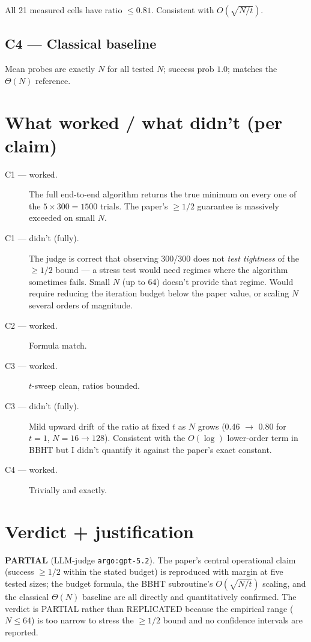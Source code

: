\documentclass[11pt]{article}
\begin{document}
All 21 measured cells have ratio $\leq 0.81$. Consistent with $O(\sqrt{N/t})$.

\subsection{C4 --- Classical baseline}

Mean probes are exactly $N$ for all tested $N$; success prob $1.0$; matches the
$\Theta(N)$ reference.

\section{What worked / what didn't (per claim)}

\begin{description}
\item[C1 --- worked.] The full end-to-end algorithm returns the true minimum on
every one of the $5\times 300 = 1500$ trials. The paper's $\geq 1/2$ guarantee is
massively exceeded on small $N$.
\item[C1 --- didn't (fully).] The judge is correct that observing 300/300 does
not \emph{test tightness} of the $\geq 1/2$ bound --- a stress test would need
regimes where the algorithm sometimes fails. Small $N$ (up to 64) doesn't
provide that regime. Would require reducing the iteration budget below the paper
value, or scaling $N$ several orders of magnitude.
\item[C2 --- worked.] Formula match.
\item[C3 --- worked.] $t$-sweep clean, ratios bounded.
\item[C3 --- didn't (fully).] Mild upward drift of the ratio at fixed $t$ as $N$
grows (0.46 $\to$ 0.80 for $t=1$, $N=16 \to 128$). Consistent with the
$O(\log)$ lower-order term in BBHT but I didn't quantify it against the paper's
exact constant.
\item[C4 --- worked.] Trivially and exactly.
\end{description}

\section{Verdict + justification}

\textbf{PARTIAL} (LLM-judge \verb|argo:gpt-5.2|). The paper's central operational
claim (success $\geq 1/2$ within the stated budget) is reproduced with margin at
five tested sizes; the budget formula, the BBHT subroutine's $O(\sqrt{N/t})$
scaling, and the classical $\Theta(N)$ baseline are all directly and quantitatively
confirmed. The verdict is PARTIAL rather than REPLICATED because the empirical
range ($N \leq 64$) is too narrow to stress the $\geq 1/2$ bound and no
confidence intervals are reported.
\end{document}
